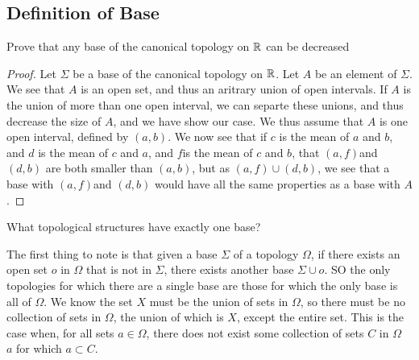 \subsection{Definition of Base}
\begin{minorEx}[Riddle]%
  Prove that any base of the canonical topology on $\mathbb{R}$ can be decreased
\end{minorEx}
\begin{proof}
  Let $\Sigma$ be a base of the canonical topology on $\mathbb{R}$. Let $A$ be an element of 
  $\Sigma$. We see that $A$ is an open set, and thus an aritrary union of open intervals. If $A$ is the union of more than one open interval, we can separte these unions, and thus decrease the size of $A$, and we have show our case. We thus assume that $A$ is one open interval, defined by $(a,b)$. We now see that if $c$ is the mean of $a$ and $b$, and $d$ is the mean of $c$ and $a$, and $f$is the mean of $c$ and $b$, that $(a,f)$and 
  $(d,b)$ are both smaller than $(a,b)$, but as $(a,f) \cup (d,b)$, we see that a base with $(a,f)$and 
  $(d,b)$ would have all the same properties as a base with $A$.
\end{proof}

\begin{minorEx}[Riddle]%
What topological structures have exactly one base?
\end{minorEx}
The first thing to note is that given a base $\Sigma$ of a topology $\Omega$, if there exists an open set $o$ in $\Omega$ that is not in $\Sigma$, there exists another base $\Sigma \cup o$. SO the only topologies for which there are a single base are those for which the only base is all of $\Omega$. We know the set $X$ must be the union of sets in $\Omega$, so there must be no collection of sets in $\Omega$, the union of which is $X$, except the entire set. This is the case when, for all sets $a \in \Omega$, there does not exist some collection of sets $C$ in $\Omega$ \ $a$ for which $a \subset C$.
